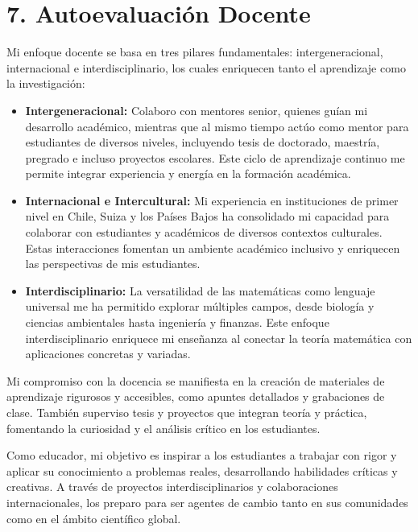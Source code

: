 \section*{7. Autoevaluación Docente}

Mi enfoque docente se basa en tres pilares fundamentales: intergeneracional, internacional e interdisciplinario, los cuales enriquecen tanto el aprendizaje como la investigación:

\begin{itemize}
    \item \textbf{Intergeneracional:} Colaboro con mentores senior, quienes guían mi desarrollo académico, mientras que al mismo tiempo actúo como mentor para estudiantes de diversos niveles, incluyendo tesis de doctorado, maestría, pregrado e incluso proyectos escolares. Este ciclo de aprendizaje continuo me permite integrar experiencia y energía en la formación académica.
    
    \item \textbf{Internacional e Intercultural:} Mi experiencia en instituciones de primer nivel en Chile, Suiza y los Países Bajos ha consolidado mi capacidad para colaborar con estudiantes y académicos de diversos contextos culturales. Estas interacciones fomentan un ambiente académico inclusivo y enriquecen las perspectivas de mis estudiantes.
    
    \item \textbf{Interdisciplinario:} La versatilidad de las matemáticas como lenguaje universal me ha permitido explorar múltiples campos, desde biología y ciencias ambientales hasta ingeniería y finanzas. Este enfoque interdisciplinario enriquece mi enseñanza al conectar la teoría matemática con aplicaciones concretas y variadas.
\end{itemize}

Mi compromiso con la docencia se manifiesta en la creación de materiales de aprendizaje rigurosos y accesibles, como apuntes detallados y grabaciones de clase. También superviso tesis y proyectos que integran teoría y práctica, fomentando la curiosidad y el análisis crítico en los estudiantes.

Como educador, mi objetivo es inspirar a los estudiantes a trabajar con rigor y aplicar su conocimiento a problemas reales, desarrollando habilidades críticas y creativas. A través de proyectos interdisciplinarios y colaboraciones internacionales, los preparo para ser agentes de cambio tanto en sus comunidades como en el ámbito científico global.